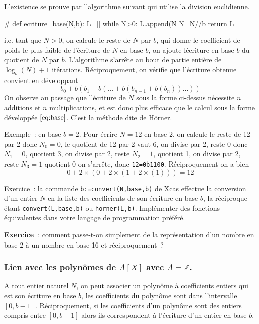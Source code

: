 \documentclass[a4paper,11pt]{book}
\begin{document}
\begin{giacjshere}
L'existence se prouve par l'algorithme suivant qui utilise la division euclidienne.
\begin{giaconload}
#
def ecriture_base(N,b):
    L=[]
    while N>0:
        L.append(N %
        N=N//b
    return L
\end{giaconload}
i.e. tant que $N>0$, on calcule le reste de $N$ par $b$, qui donne
le coefficient de poids le plus faible de l'\'ecriture de $N$ en base
$b$, on ajoute l\'ecriture en base $b$ du quotient de $N$ par $b$.
L'algorithme s'arr\^ete au bout de partie enti\`ere de $\log_b(N)+1$
it\'erations.
R\'eciproquement, on v\'erifie que l'\'ecriture obtenue
convient en d\'eveloppant
\begin{equation} \label{eq:horner}
 b_0+b(b_{1}+b(...+b(b_{n-1}+b(b_n))...))
\end{equation}
On observe au passage que l'\'ecriture de $N$ sous la forme ci-dessus
n\'ecessite $n$ additions et $n$ multiplications, et est donc plus
efficace que le calcul sous la forme d\'evelopp\'ee \(\ref{eq:base}\).
C'est la m\'ethode dite de H\"orner.

Exemple~: en base $b=2$. Pour \'ecrire $N=12$ en base 2, on calcule le
reste de 12 par 2 donc $N_0=0$, le quotient de 12 par 2 vaut 6, on
divise par 2, reste 0 donc $N_1=0$, quotient 3, on divise par 2, reste
$N_2=1$, quotient 1, on divise par 2, reste $N_3=1$ quotient 0 on
s'arr\^ete, donc \verb|12=0b1100|.
R\'eciproquement on a bien
$$ 0 +2\times(0+2\times(1+2\times(1)))=12 $$

Exercice~: la commande \verb|b:=convert(N,base,b)| de Xcas effectue la conversion
d'un entier $N$ en la liste des coefficients de son \'ecriture en base
$b$, la r\'eciproque \'etant \verb|convert(L,base,b)| ou
\verb|horner(L,b)|. Impl\'ementer des fonctions \'equivalentes
dans  votre langage de programmation pr\'ef\'er\'e.
 
{\bf Exercice~}: 
comment passe-t-on simplement de la représentation d'un nombre en
base 2 à un nombre en base 16 et réciproquement~?

\subsubsection{Lien avec les polyn\^omes de $A[X]$ avec
  $A=\mathbb{Z}$.}
A tout entier naturel $N$, on peut associer un polyn\^ome \`a coefficients entiers
qui est son \'ecriture en base $b$, les coefficients du polyn\^ome
sont dans l'intervalle $[0,b-1]$. R\'eciproquement, si les
coefficients d'un polyn\^ome sont des entiers compris entre $[0,b-1]$
alors ils correspondent \`a l'\'ecriture d'un entier en base $b$.


\end{giacjshere}
\end{document}
